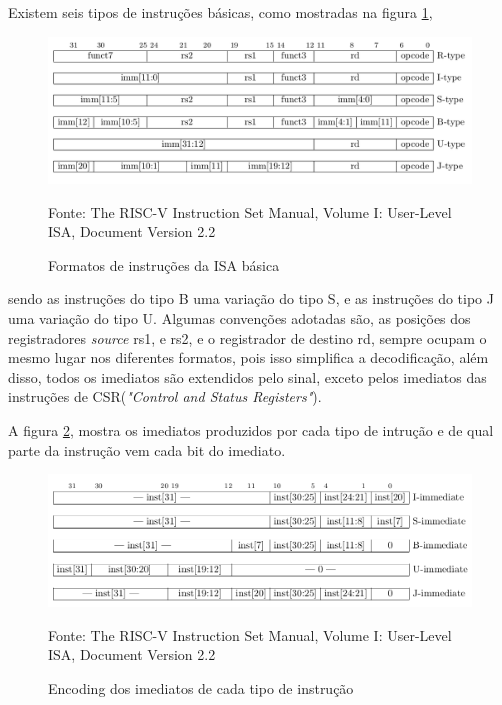 		Existem seis tipos de instruções básicas, como mostradas na figura \ref{fig:instruction_formats},

		\begin{figure}[h]
		  \includegraphics[width=\linewidth]{img/instruction_formats.png}
		  \caption{Formatos de instruções da ISA básica}
		  Fonte: The RISC-V Instruction Set Manual, Volume I: User-Level ISA, Document Version 2.2~\cite{riscv_spec}
		  \label{fig:instruction_formats}
		\end{figure}

		sendo as instruções do tipo B uma variação do tipo S, e as instruções do tipo J uma variação do tipo U. Algumas convenções adotadas são, as posições dos registradores \textit{source} rs1, e rs2, e o registrador de destino rd, sempre ocupam o mesmo lugar nos diferentes formatos, pois isso simplifica a decodificação, além disso, todos os imediatos são extendidos pelo sinal, exceto pelos imediatos das instruções de CSR(\textit{"Control and Status Registers"}). 

		A figura \ref{fig:immediate_encoding}, mostra os imediatos produzidos por cada tipo de intrução e de qual parte da instrução vem cada bit do imediato.

		\begin{figure}[h]
		  \includegraphics[width=\linewidth]{img/immediate_encoding.png}
		  \caption{Encoding dos imediatos de cada tipo de instrução}
		  Fonte: The RISC-V Instruction Set Manual, Volume I: User-Level ISA, Document Version 2.2~\cite{riscv_spec}
		  \label{fig:immediate_encoding}
		\end{figure}

